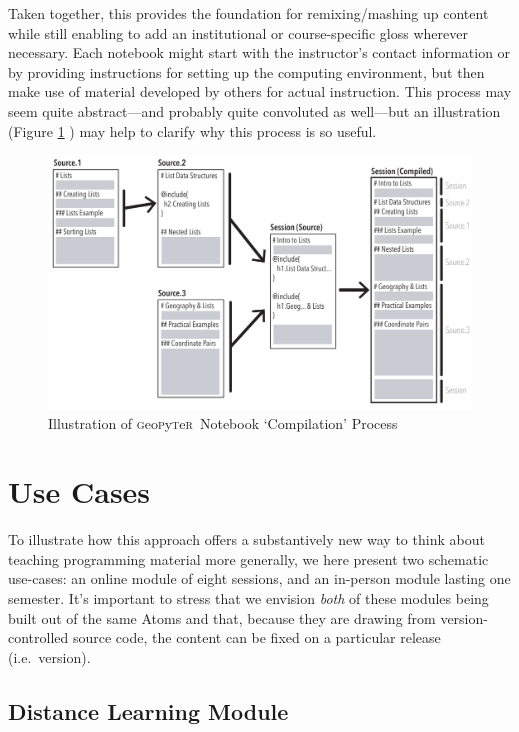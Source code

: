 \documentclass[letter, 11pt,titlepage]{article}
\newcommand{\gp}{\textsc{g}eo\textsc{p}y\textsc{t}e\textsc{r}~\/}
\newcommand{\ie}{i.e.~\/}
\begin{document}
Taken together, this provides the foundation for remixing/mashing up content while still enabling to add an institutional or course-specific gloss wherever necessary. Each notebook might start with the instructor's contact information or by providing instructions for setting up the computing environment, but then make use of material developed by others for actual instruction. This process may seem quite abstract---and probably quite convoluted as well---but an illustration (Figure \ref{fig:compiling} ) may help to clarify why this process is so useful.

\begin{figure}[hbtp]
  \centering
  \caption{Illustration of \gp Notebook `Compilation' Process}
  \label{fig:compiling}
  \includegraphics[width=\textwidth, angle=0]{Multiple_Documents.pdf}
\end{figure}

\section{Use Cases}\label{uses}

To illustrate how this approach offers a substantively new way to think about teaching programming material more generally, we here present two schematic use-cases: an online module of eight sessions, and an in-person module lasting one semester. It's important to stress that we envision \emph{both} of these modules being built out of the same Atoms and that, because they are drawing from version-controlled source code, the content can be fixed on a particular release (\ie version).

\subsection{Distance Learning Module}\label{an-online-module}
\end{document}
